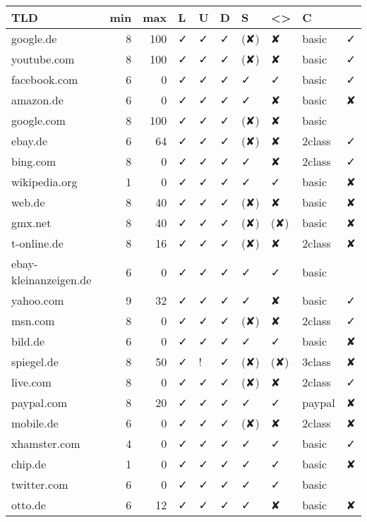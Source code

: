 {\footnotesize
\begin{longtable}{lrrlllllll}
		TLD   & \multicolumn{1}{l}{min} & \multicolumn{1}{l}{max} & L & U & D & S & <> & C & \emoji{1F4D6} \\ \hline
		\endhead
		google.de & 8     & 100   & ✓ & ✓ & ✓ & (✘) & ✘ & basic & ✓\\
		youtube.com & 8     & 100   & ✓ & ✓ & ✓ & (✘) & ✘ & basic & ✓\\
		facebook.com & 6     & 0     & ✓ & ✓ & ✓ & ✓ & ✓ & basic & ✓\\
		amazon.de & 6     & 0     & ✓ & ✓ & ✓ & ✓ & ✘ & basic & ✘\\
		google.com & 8     & 100   & ✓ & ✓ & ✓ & (✘) & ✘ & basic &\\
		ebay.de & 6     & 64    & ✓ & ✓ & ✓ & (✘) & ✘ & 2class & ✓\\
		bing.com & 8     & 0     & ✓ & ✓ & ✓ & ✓ & ✘ & 2class & ✓ \\
		wikipedia.org & 1     & 0     & ✓ & ✓ & ✓ & ✓ & ✓ & basic & ✘\\
		web.de & 8     & 40    & ✓ & ✓ & ✓ & (✘) & ✘ & basic & ✘ \\
		gmx.net & 8     & 40    & ✓ & ✓ & ✓ & (✘) & (✘) & basic & ✘ \\
		t-online.de & 8     & 16    & ✓ & ✓ & ✓ & (✘) & ✘ & 2class & ✘\\
		ebay-kleinanzeigen.de & 6     & 0     & ✓ & ✓ & ✓ & ✓ & ✓ & basic &\\
		yahoo.com & 9     & 32    & ✓ & ✓ & ✓ & ✓ & ✘ & basic & ✓\\
		msn.com & 8     & 0     & ✓ & ✓ & ✓ & (✘) & ✘ & 2class & ✓\\
		bild.de & 6     & 0     & ✓ & ✓ & ✓ & ✓ & ✓ & basic & ✘\\
		spiegel.de & 8     & 50    & ✓ & ! & ✓ & (✘) & (✘) & 3class & ✘\\
		live.com & 8     & 0     & ✓ & ✓ & ✓ & (✘) & ✘ & 2class & ✓\\
		paypal.com & 8     & 20    & ✓ & ✓ & ✓ & ✓ & ✓ & paypal & ✘\\
		mobile.de & 6     & 0     & ✓ & ✓ & ✓ & (✘) & ✘ & 2class & ✘\\
		xhamster.com & 4     & 0     & ✓ & ✓ & ✓ & ✓ & ✓ & basic & ✓\\
		chip.de & 1     & 0     & ✓ & ✓ & ✓ & ✓ & ✓ & basic & ✘\\
		twitter.com & 6     & 0     & ✓ & ✓ & ✓ & ✓ & ✓ & basic &\\
		otto.de & 6     & 12    & ✓ & ✓ & ✓ & ✓ & ✘ & basic & ✘\\

\end{longtable}}
